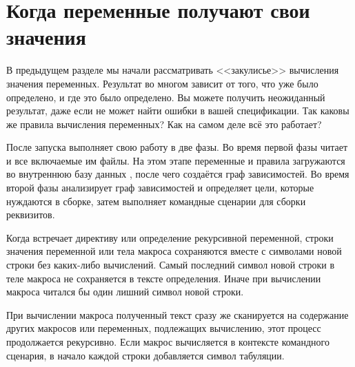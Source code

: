 \section{Когда переменные получают свои значения}
\label{sec:when_vars_are_expanded}

В предыдущем разделе мы начали рассматривать <<закулисье>> вычисления
значения переменных. Результат во многом зависит от того, что уже было
определено, и где это было определено. Вы можете получить неожиданный
результат, даже если \GNUmake{} не может найти ошибки в вашей
спецификации. Так каковы же правила вычисления переменных? Как на
самом деле всё это работает?

После запуска \GNUmake{} выполняет свою работу в две фазы. Во время
первой фазы \GNUmake{} читает \Makefile{} и все включаемые им файлы.
На этом этапе переменные и правила загружаются во внутреннюю базу
данных \GNUmake{}, после чего создаётся граф зависимостей. Во время
второй фазы \GNUmake{} анализирует граф зависимостей и определяет
цели, которые нуждаются в сборке, затем выполняет командные сценарии
для сборки реквизитов.

Когда \GNUmake{} встречает директиву  или
определение рекурсивной переменной, строки значения переменной или
тела макроса сохраняются вместе с символами новой строки без
каких-либо вычислений. Самый последний символ новой строки в теле
макроса не сохраняется в тексте определения. Иначе при вычислении
макроса читался бы один лишний символ новой строки.

При вычислении макроса полученный текст сразу же сканируется на
содержание других макросов или переменных, подлежащих вычислению, этот
процесс продолжается рекурсивно. Если макрос вычисляется в контексте
командного сценария, в начало каждой строки добавляется символ
табуляции.

